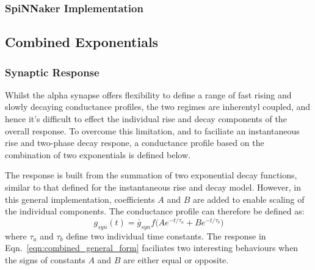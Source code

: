 \documentclass[12pt]{article}
\begin{document}
\subsubsection*{SpiNNaker Implementation}

\subsection{Combined Exponentials}
\subsubsection*{Synaptic Response}
Whilst the alpha synapse offers flexibility to define a range of fast rising and
slowly decaying conductance profiles, the two regimes are inherentyl coupled,
and hence it's difficult to effect the individual rise and decay components of
the overall response. To overcome this limitation, and to faciliate
an instantaneous rise and two-phase decay respone, a conductance profile based
on the combination of two exponentials is defined below.

The response is built from the summation of two exponential decay functions,
similar to that defined for the instantaneous rise and decay model. However, in
this general implementation, coefficients $A$ and $B$ are added to enable
scaling of the individual components. The conductance profile can therefore be
defined as:
\begin{equation}
g_{syn}(t)=\bar{g}_{syn}f\Big(Ae^{-t / \tau_a} + Be^{-t / \tau_b}\Big)
\label{eqn:combined_general_form}
\end{equation}
where $\tau_a$ and $\tau_b$ define two individual time constants. The response
in Eqn.~\ref{eqn:combined_general_form} faciliates two interesting behaviours
when the signs of constants $A$ and $B$ are either equal or opposite.
\end{document}
